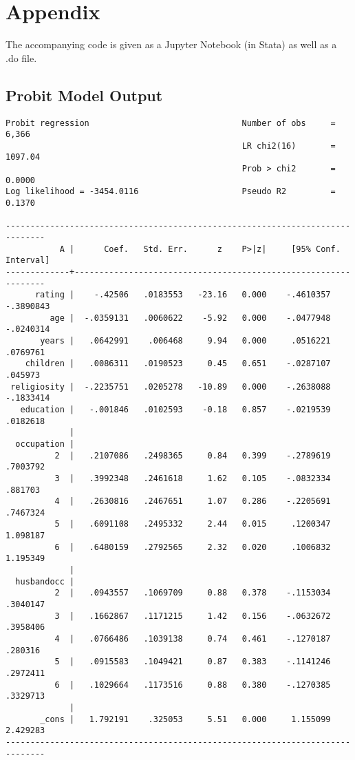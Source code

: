 \documentclass{article}
\begin{document}
\section{Appendix}
The accompanying code is given as a Jupyter Notebook (in Stata) as well as a .do file.

\hypertarget{probitoutput}{\subsection*{Probit Model Output}}
\begin{verbatim}
Probit regression                               Number of obs     =      6,366
                                                LR chi2(16)       =    1097.04
                                                Prob > chi2       =     0.0000
Log likelihood = -3454.0116                     Pseudo R2         =     0.1370

------------------------------------------------------------------------------
           A |      Coef.   Std. Err.      z    P>|z|     [95% Conf. Interval]
-------------+----------------------------------------------------------------
      rating |    -.42506   .0183553   -23.16   0.000    -.4610357   -.3890843
         age |  -.0359131   .0060622    -5.92   0.000    -.0477948   -.0240314
       years |   .0642991    .006468     9.94   0.000     .0516221    .0769761
    children |   .0086311   .0190523     0.45   0.651    -.0287107     .045973
 religiosity |  -.2235751   .0205278   -10.89   0.000    -.2638088   -.1833414
   education |   -.001846   .0102593    -0.18   0.857    -.0219539    .0182618
             |
  occupation |
          2  |   .2107086   .2498365     0.84   0.399    -.2789619    .7003792
          3  |   .3992348   .2461618     1.62   0.105    -.0832334     .881703
          4  |   .2630816   .2467651     1.07   0.286    -.2205691    .7467324
          5  |   .6091108   .2495332     2.44   0.015     .1200347    1.098187
          6  |   .6480159   .2792565     2.32   0.020     .1006832    1.195349
             |
  husbandocc |
          2  |   .0943557   .1069709     0.88   0.378    -.1153034    .3040147
          3  |   .1662867   .1171215     1.42   0.156    -.0632672    .3958406
          4  |   .0766486   .1039138     0.74   0.461    -.1270187     .280316
          5  |   .0915583   .1049421     0.87   0.383    -.1141246    .2972411
          6  |   .1029664   .1173516     0.88   0.380    -.1270385    .3329713
             |
       _cons |   1.792191    .325053     5.51   0.000     1.155099    2.429283
------------------------------------------------------------------------------
\end{verbatim}
\end{document}
